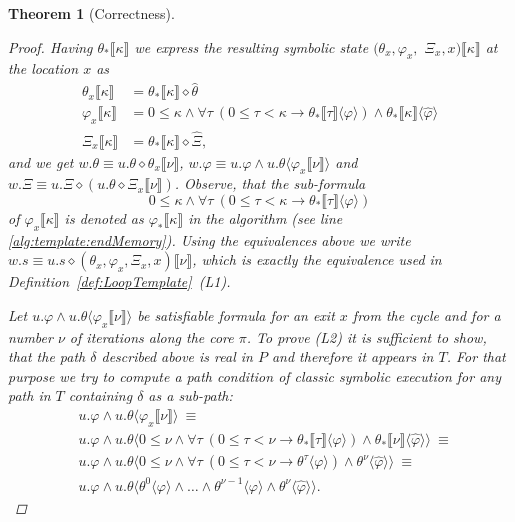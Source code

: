 \documentclass{sig-alternate}%
\newtheorem{thm}{Theorem}%
\newcommand{\prm}[1]{\ensuremath{\llbracket #1 \rrbracket}}
\newcommand{\ese}[1]{\ensuremath{\langle #1 \rangle}}
\newcommand{\compose}{\ensuremath{\diamond}}
\begin{document}
\begin{thm}[Correctness]
\begin{proof}
Having $\theta_*\prm{\kappa}$ we express the resulting symbolic state
$(\theta_x, \varphi_x,$ $\Xi_x, x)\prm{\kappa}$ at the location $x$ as
\begin{align*}
\theta_x\prm{\kappa} &= \theta_*\prm{\kappa} \compose \hat{\theta}
\\
\varphi_x\prm{\kappa} &= 0 \leq \kappa \wedge \forall \tau~(0 \leq
\tau < \kappa \rightarrow \theta_*\prm{\tau}\ese{\varphi}) \wedge
\theta_*\prm{\kappa}\ese{\hat{\varphi}}
\\
\Xi_x\prm{\kappa} &= \theta_*\prm{\kappa} \compose \hat{\Xi},
\end{align*}
and we get $w.\theta \equiv u.\theta \compose \theta_x\prm{\nu}$,
$w.\varphi \equiv u.\varphi \wedge u.\theta\ese{\varphi_x\prm{\nu}}$
and $w.\Xi \equiv u.\Xi \compose (u.\theta \compose \Xi_x\prm{\nu})$. Observe, that 
the sub-formula
\[
 0 \leq \kappa \wedge \forall \tau~(0 \leq
\tau < \kappa \rightarrow \theta_*\prm{\tau}\ese{\varphi})
\]
of $\varphi_x\prm{\kappa}$ is denoted as $\varphi_*\prm{\kappa}$ in
the algorithm (see line \ref{alg:template:endMemory}). Using the
equivalences above we write $w.s \equiv u.s \compose (\theta_x,
\varphi_x, \Xi_x, x)\prm{\nu}$, which is exactly the equivalence used
in Definition~\ref{def:LoopTemplate}~(L1).

Let $u.\varphi \wedge u.\theta\ese{\varphi_x\prm{\nu}}$ be satisfiable
formula for an exit $x$ from the cycle and for a number $\nu$ of
iterations along the core $\pi$. To prove (L2) it is sufficient to
show, that the path $\delta$ described above is real in $P$ and
therefore it appears in $T$. For that purpose we try to compute a path
condition of \emph{classic} symbolic execution for any path in $T$
containing $\delta$ as a sub-path:
\begin{align*}
&u.\varphi \wedge u.\theta\ese{\varphi_x\prm{\nu}}~\equiv\\
&u.\varphi \wedge u.\theta\ese{0 \leq \nu \wedge \forall
\tau~(0 \leq \tau < \nu \rightarrow \theta_*\prm{\tau}\ese{\varphi}) \wedge
\theta_*\prm{\nu}\ese{\hat{\varphi}}}~\equiv\\
&u.\varphi \wedge u.\theta\ese{0 \leq \nu \wedge \forall
\tau~(0 \leq \tau < \nu \rightarrow \theta^{\tau}\ese{\varphi}) \wedge
\theta^{\nu}\ese{\hat{\varphi}}}~\equiv\\
&u.\varphi \wedge
u.\theta\ese{\theta^0\ese{\varphi} \wedge \ldots \wedge
\theta^{\nu-1}\ese{\varphi} \wedge \theta^{\nu}\ese{\hat{\varphi}}}.
\end{align*}
\end{proof}
\end{thm}
\end{document}
